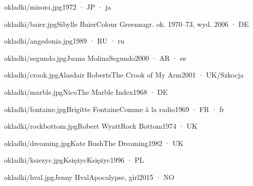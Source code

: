 \documentclass[10pt,twoside]{article}
\begin{document}
\begin{album}{okladki/misora.jpg}{}{}{1972 · JP · ja}
\lipsum[27][1-3]
\end{album}

\begin{album}{okladki/baier.jpg}{Sibylle Baier}{Colour Green}{nagr. ok. 1970–73, wyd. 2006 · DE}
\lipsum[28][1-3]
\end{album}

\begin{album}{okladki/angedonia.jpg}{}{}{1989 · RU · ru}
\lipsum[29][1-3]
\end{album}

\begin{album}{okladki/segundo.jpg}{Juana Molina}{Segundo}{2000 · AR · es}
\lipsum[30][1-3]
\end{album}

\begin{album}{okladki/crook.jpg}{Alasdair Roberts}{The Crook of My Arm}{2001 · UK/Szkocja}
\lipsum[31][1-3]
\end{album}

\lipsum[32]

\begin{album}{okladki/marble.jpg}{Nico}{The Marble Index}{1968 · DE}
\lipsum[33][1-3]
\end{album}

\begin{album}{okladki/fontaine.jpg}{Brigitte Fontaine}{Comme à la radio}{1969 · FR · fr}
\lipsum[34][1-3]
\end{album}

\begin{album}{okladki/rockbottom.jpg}{Robert Wyatt}{Rock Bottom}{1974 · UK}
\lipsum[35][1-3]
\end{album}

\begin{album}{okladki/dreaming.jpg}{Kate Bush}{The Dreaming}{1982 · UK}
\lipsum[36][1-3]
\end{album}

\begin{album}{okladki/ksiezyc.jpg}{Księżyc}{Księżyc}{1996 · PL}
\lipsum[37][1-3]
\end{album}

\begin{album}{okladki/hval.jpg}{Jenny Hval}{Apocalypse, girl}{2015 · NO}
\lipsum[38][1-3]
\end{album}
\end{document}
